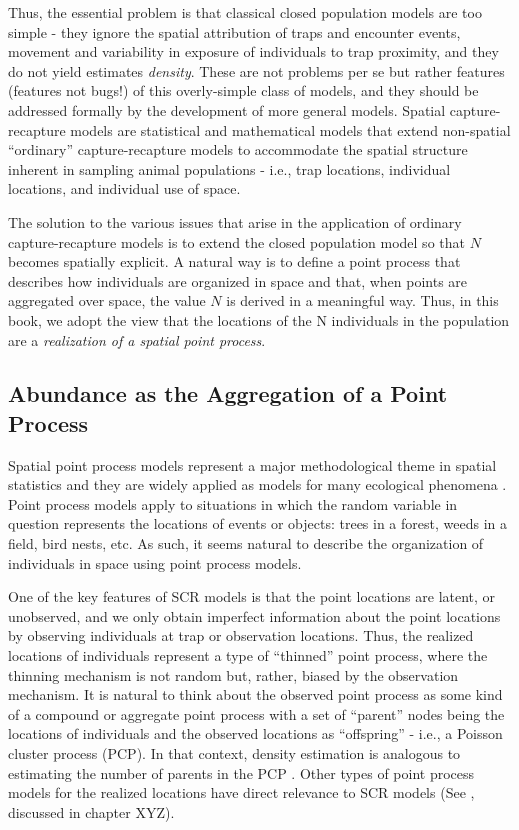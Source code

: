 Thus, the essential problem is that classical closed population models
are too simple - they ignore the spatial attribution of traps and
encounter events, movement and variability in exposure of individuals
to trap proximity, and they do not yield estimates {\it density}.
These are not problems per se but rather features (features
not bugs!) of this overly-simple class of models, and they 
should be addressed formally by the development of
more general models.  Spatial capture-recapture models are
statistical and mathematical models that extend non-spatial
``ordinary'' capture-recapture models to accommodate the spatial
structure inherent in sampling animal populations - i.e., trap
locations, individual locations, and individual use of space.

The solution to the various issues that arise in the application of
ordinary capture-recapture models is to extend the closed population
model so that $N$ becomes spatially explicit.  A natural way is to
define a point process \citep{efford:2004} that describes how
individuals are organized in space and that, when points are
aggregated over space, the value $N$ is derived in a meaningful way.
Thus, in this book, we adopt the view that the locations of the N
individuals in the population are a {\it realization of a spatial
  point process}.


\subsection{Abundance as the Aggregation of a Point Process}

Spatial point process models represent a major methodological theme in
spatial statistics \citep[][ch. xyz]{cressie:1992} and they are
widely applied as models for many ecological phenomena 
\citep{stoyan_penttinen:2000,illian:2008}. Point process models apply to
situations in which the random variable in question represents the
locations of events or objects: trees in a forest, weeds in a field,
bird nests, etc.  As such, it seems natural to describe the
organization of individuals in space using point process models. 

One
of the key features of SCR models is that the point locations are
latent, or unobserved, and we only obtain imperfect information about
the point locations by observing individuals at trap or observation
locations.  Thus, the realized locations of individuals represent a
type of ``thinned'' point process, where the thinning mechanism is not
random but, rather, biased by the observation mechanism.  It is
natural to think about the observed point process as some kind of a
compound or aggregate point process with a set of ``parent'' nodes
being the locations of individuals and the observed locations as
``offspring'' - i.e., a Poisson cluster process (PCP). In that
context, density estimation is analogous to estimating the number of
parents in the PCP \citep{chandler_royle:2012}. Other types of point
process models for the realized locations have direct relevance to SCR
models (See \citet{chandler_royle:2012}, discussed in chapter XYZ).

